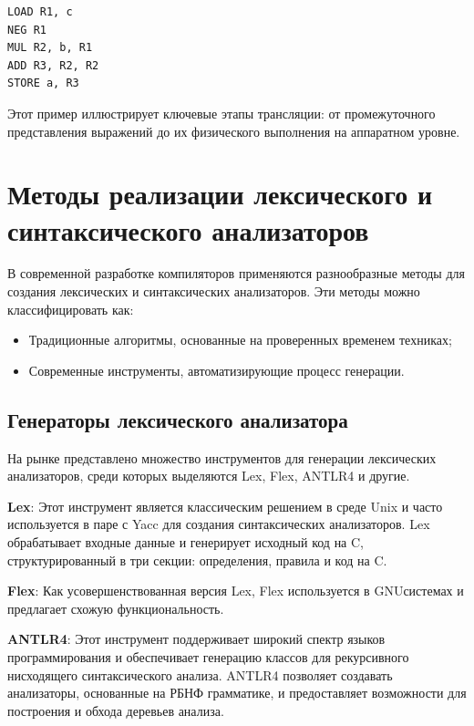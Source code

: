 \begin{lstlisting}[label = 6, caption = Шаг 3. Генерация машинного кода. Промежуточный код транслируется в инструкции для конкретной целевой машины]
LOAD R1, c
NEG R1
MUL R2, b, R1
ADD R3, R2, R2
STORE a, R3
\end{lstlisting}

Этот пример иллюстрирует ключевые этапы трансляции: от промежуточного представления выражений до их физического выполнения на аппаратном уровне.

\section{Методы реализации лексического и синтаксического анализаторов}
В современной разработке компиляторов применяются разнообразные методы для создания лексических и синтаксических анализаторов. Эти методы можно классифицировать как:

\begin{itemize}[label = ---]
    \item Традиционные алгоритмы, основанные на проверенных временем техниках;
    \item Современные инструменты, автоматизирующие процесс генерации.
\end{itemize}

\subsection{Генераторы лексического анализатора}
На рынке представлено множество инструментов для генерации лексических анализаторов, среди которых выделяются Lex, Flex, ANTLR4 и другие. \cite{2}

\textbf{Lex}: Этот инструмент является классическим решением в среде Unix и часто используется в паре с Yacc для создания синтаксических анализаторов. Lex обрабатывает входные данные и генерирует исходный код на C, структурированный в три секции: определения, правила и код на C.

\textbf{Flex}: Как усовершенствованная версия Lex, Flex используется в GNUсистемах и предлагает схожую функциональность.

\textbf{ANTLR4}: Этот инструмент поддерживает широкий спектр языков программирования и обеспечивает генерацию классов для рекурсивного нисходящего синтаксического анализа. ANTLR4 позволяет создавать анализаторы, основанные на РБНФ грамматике, и предоставляет возможности для построения и обхода деревьев анализа.

